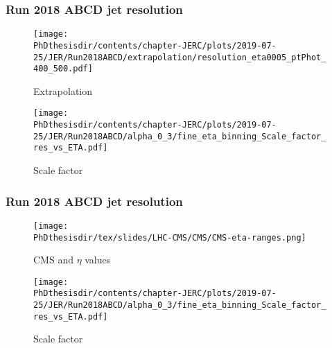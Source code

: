 \begin{frame}
\frametitle{Run 2018 ABCD jet resolution}
\begin{minipage}{.45\textwidth}
\begin{figure}
\texttt{[image: \\PhDthesisdir/contents/chapter-JERC/plots/2019-07-25/JER/Run2018ABCD/extrapolation/resolution\_eta0005\_ptPhot\_400\_500.pdf]}
\caption{Extrapolation}
\end{figure}
\end{minipage}
\hfill
\begin{minipage}{.45\textwidth}
\begin{figure}
\texttt{[image: \\PhDthesisdir/contents/chapter-JERC/plots/2019-07-25/JER/Run2018ABCD/alpha\_0\_3/fine\_eta\_binning\_Scale\_factor\_res\_vs\_ETA.pdf]}
\caption{Scale factor}
\end{figure}
\end{minipage}
\end{frame}

\begin{frame}\addtocounter{framenumber}{-1}
\frametitle{Run 2018 ABCD jet resolution}
\begin{minipage}{.45\textwidth}
\begin{figure}
\texttt{[image: \\PhDthesisdir/tex/slides/LHC-CMS/CMS/CMS-eta-ranges.png]}
\caption{CMS and $\eta$ values}
\end{figure}
\end{minipage}
\hfill
\begin{minipage}{.45\textwidth}
\begin{figure}
\texttt{[image: \\PhDthesisdir/contents/chapter-JERC/plots/2019-07-25/JER/Run2018ABCD/alpha\_0\_3/fine\_eta\_binning\_Scale\_factor\_res\_vs\_ETA.pdf]}
\caption{Scale factor}
\end{figure}
\end{minipage}
\end{frame}
